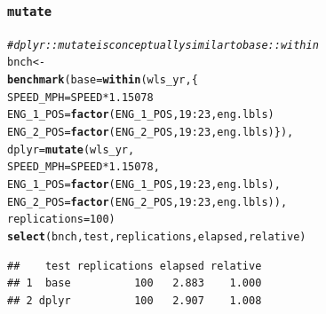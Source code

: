 \documentclass{beamer}\usepackage[]{graphicx}\usepackage[]{color}
\makeatletter
\newcommand{\hlnum}[1]{\textcolor[rgb]{0.686,0.059,0.569}{#1}}%
\newcommand{\hlcom}[1]{\textcolor[rgb]{0.678,0.584,0.686}{\textit{#1}}}%
\newcommand{\hlopt}[1]{\textcolor[rgb]{0,0,0}{#1}}%
\newcommand{\hlstd}[1]{\textcolor[rgb]{0.345,0.345,0.345}{#1}}%
\newcommand{\hlkwb}[1]{\textcolor[rgb]{0.69,0.353,0.396}{#1}}%
\newcommand{\hlkwc}[1]{\textcolor[rgb]{0.333,0.667,0.333}{#1}}%
\newcommand{\hlkwd}[1]{\textcolor[rgb]{0.737,0.353,0.396}{\textbf{#1}}}%
\newenvironment{kframe}{%
 \def\at@end@of@kframe{}%
 \ifinner\ifhmode%
  \def\at@end@of@kframe{\end{minipage}}%
  \begin{minipage}{\columnwidth}%
 \fi\fi%
 \def\FrameCommand##1{\hskip\@totalleftmargin \hskip-\fboxsep
 \colorbox{shadecolor}{##1}\hskip-\fboxsep
     \hskip-\linewidth \hskip-\@totalleftmargin \hskip\columnwidth}%
 \MakeFramed {\advance\hsize-\width
   \@totalleftmargin\z@ \linewidth\hsize
   \@setminipage}}%
 {\par\unskip\endMakeFramed%
 \at@end@of@kframe}
\newenvironment{knitrout}{}{} %
\makeatother
\begin{document}
\begin{frame}[fragile]
  \frametitle{{\tt mutate}}
\begin{knitrout}\footnotesize
{}\color{fgcolor}\begin{kframe}
\begin{alltt}
\hlcom{# dplyr::mutate is conceptually similar to base::within}
\hlstd{bnch} \hlkwb{<-}
\hlkwd{benchmark}\hlstd{(}\hlkwc{base} \hlstd{=} \hlkwd{within}\hlstd{(wls_yr, \{}
                        \hlstd{SPEED_MPH} \hlkwb{=} \hlstd{SPEED} \hlopt{*} \hlnum{1.15078}
                        \hlstd{ENG_1_POS} \hlkwb{=} \hlkwd{factor}\hlstd{(ENG_1_POS,} \hlnum{19}\hlopt{:}\hlnum{23}\hlstd{, eng.lbls)}
                        \hlstd{ENG_2_POS} \hlkwb{=} \hlkwd{factor}\hlstd{(ENG_2_POS,} \hlnum{19}\hlopt{:}\hlnum{23}\hlstd{, eng.lbls)\}),}
          \hlkwc{dplyr} \hlstd{=} \hlkwd{mutate}\hlstd{(wls_yr,}
                         \hlkwc{SPEED_MPH} \hlstd{= SPEED} \hlopt{*} \hlnum{1.15078}\hlstd{,}
                         \hlkwc{ENG_1_POS} \hlstd{=} \hlkwd{factor}\hlstd{(ENG_1_POS,} \hlnum{19}\hlopt{:}\hlnum{23}\hlstd{, eng.lbls),}
                         \hlkwc{ENG_2_POS} \hlstd{=} \hlkwd{factor}\hlstd{(ENG_2_POS,} \hlnum{19}\hlopt{:}\hlnum{23}\hlstd{, eng.lbls)),}
          \hlkwc{replications} \hlstd{=} \hlnum{100}\hlstd{)}
\hlkwd{select}\hlstd{(bnch, test, replications, elapsed, relative)}
\end{alltt}
\begin{verbatim}
##    test replications elapsed relative
## 1  base          100   2.883    1.000
## 2 dplyr          100   2.907    1.008
\end{verbatim}
\end{kframe}
\end{knitrout}
\end{frame} 
\end{document}

